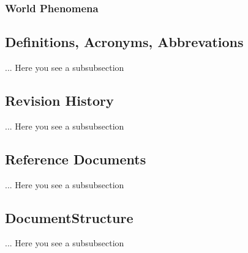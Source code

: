 \subsubsection{World Phenomena}
\subsection{Definitions, Acronyms, Abbrevations}
... Here you see a subsubsection
\subsection{Revision History}
... Here you see a subsubsection
\subsection{Reference Documents}
... Here you see a subsubsection
\subsection{DocumentStructure}
... Here you see a subsubsection

